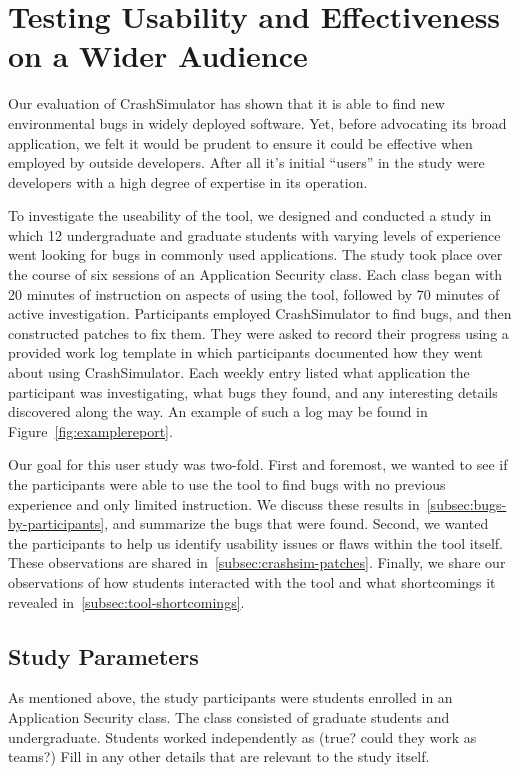 \chapter{Testing Usability and Effectiveness on a Wider Audience}
\label{chap:userstudy}

Our evaluation of CrashSimulator has shown that it is able to find new environmental bugs in widely deployed software. Yet, before advocating its broad application, we felt it would be prudent to ensure it
could be effective when employed by outside developers.
After all it's initial ``users'' in the study were developers with a high degree of expertise in its operation.

To investigate the useability of the tool,
we designed and conducted a study in which 12 undergraduate and graduate students with varying levels of experience went looking for bugs in commonly used applications.
The study took place over the course of six sessions
of an Application Security class.
Each class began with 20
minutes of instruction on aspects of using the tool, followed by 70 minutes of active investigation. Participants employed
CrashSimulator to find bugs, and then constructed patches to fix
them.
They were asked to record their progress
using a provided work log template in which participants documented
how they went about using CrashSimulator. 
Each weekly entry listed what application the participant was
investigating,  what bugs they found, and any interesting details discovered along the way. An example of such a log may be found in Figure~\ref{fig:examplereport}.

Our goal for this user study was two-fold.  First and foremost,
we wanted to see if the participants were able to use the tool to find bugs with no previous experience and only limited instruction.
We discuss these results in~\ref{subsec:bugs-by-participants}, and summarize the bugs that were found.
Second, we wanted the participants to help us identify usability issues
or flaws within the tool itself. These observations are shared in~\ref{subsec:crashsim-patches}. Finally, we share our observations
of how students interacted with the tool and what shortcomings
it revealed in~\ref{subsec:tool-shortcomings}.

\section{Study Parameters}
\label{sec:studyparameters}

As mentioned above, the study participants were students enrolled in an Application Security class. The class consisted of   graduate students and   undergraduate. Students worked independently as (true? could they work as teams?) Fill in any other details that are relevant to the study itself.

